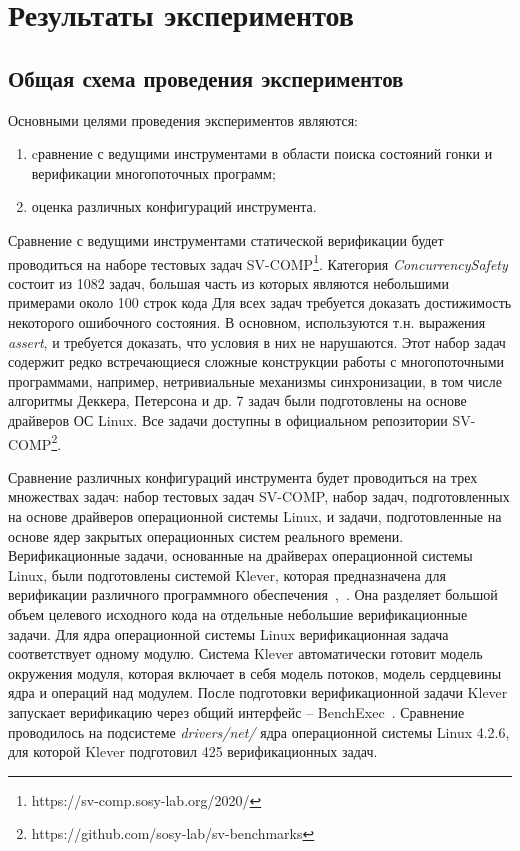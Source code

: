 \chapter{Результаты экспериментов}
\label{chapter_evaluation}

\newcommand{\theory}{CPALockator-Reach}
\newcommand{\theoryraces}{CPALockator-TM}
\newcommand{\combatmode}{CPALockator-Inv}

\section{Общая схема проведения экспериментов}

Основными целями проведения экспериментов являются:
\begin{enumerate}
\item cравнение с ведущими инструментами в области поиска состояний гонки и верификации многопоточных программ;
\item оценка различных конфигураций инструмента.
\end{enumerate}

Сравнение с ведущими инструментами статической верификации будет проводиться на наборе тестовых задач SV-COMP\footnote{https://sv-comp.sosy-lab.org/2020/}.
Категория {\em ConcurrencySafety} состоит из 1082 задач, большая часть из которых являются небольшими примерами около 100 строк кода
Для всех задач требуется доказать достижимость некоторого ошибочного состояния. 
В основном, используются т.н. выражения \textit{assert}, и требуется доказать, что условия в них не нарушаются. 
Этот набор задач содержит редко встречающиеся сложные конструкции работы с многопоточными программами, например, нетривиальные механизмы синхронизации, в том числе алгоритмы Деккера, Петерсона и др.
7 задач были подготовлены на основе драйверов ОС Linux. Все задачи доступны в официальном репозитории SV-COMP\footnote{https://github.com/sosy-lab/sv-benchmarks}.

Сравнение различных конфигураций инструмента будет проводиться на трех множествах задач: набор тестовых задач SV-COMP, набор задач, подготовленных на основе драйверов операционной системы Linux, и задачи, подготовленные на основе ядер закрытых операционных систем реального времени.
Верификационные задачи, основанные на драйверах операционной системы Linux, были подготовлены системой Klever, которая предназначена для верификации различного программного обеспечения~\cite{kleverPsi},~\cite{kleverIsola}.
Она разделяет большой объем целевого исходного кода на отдельные небольшие верификационные задачи.
Для ядра операционной системы Linux верификационная задача соответствует одному модулю.
Система Klever автоматически готовит модель окружения модуля, которая включает в себя модель потоков, модель сердцевины ядра и операций над модулем.
После подготовки верификационной задачи Klever запускает верификацию через общий интерфейс -- BenchExec~\cite{benchexec2019}.
Сравнение проводилось на подсистеме \textit{drivers/net/} ядра операционной системы Linux 4.2.6, для которой Klever подготовил 425 верификационных задач.

